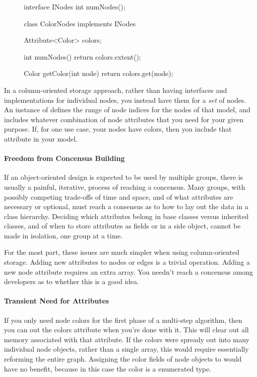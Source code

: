\begin{figure}
\begin{framedlisting}
interface INodes {
  int numNodes();
}

class ColorNodes implements INodes {
  Attribute<Color> colors;
  
  int numNodes() {
    return colors.extent();
  }
  
  Color getColor(int node) {
    return colors.get(node);
  }
}
\end{framedlisting}
\end{figure}
In a column-oriented storage approach, rather than having interfaces and
implementations for individual nodes, you instead have them for a
\emph{set} of nodes. An instance of  
defines the range of node indices for the nodes of that model, and includes
whatever combination of node attributes that you need for your given purpose.
If, for one use case, your nodes have colors, then you include that attribute in
your  model.

\paragraph{Freedom from Concensus Building}
If an object-oriented design is expected to be used by multiple groups, there is
usually a painful, iterative, process of reaching a concensus. Many groups, with
possibly competing trade-offs of time and space, and of what attributes are
necessary or optional, must reach a consensus as to how to lay out the data in a
class hierarchy.
Deciding which attributes belong in base classes versus
inherited classes, and of when to store attributes as fields or in a side
object, cannot be made in isolation, one group at a time. 

For the most part, these issues are much simpler when using column-oriented
storage. Adding new attributes to nodes or edges is a trivial operation. Adding
a new node attribute requires an extra array. You needn't reach a concensus
among developers as to whether this is a good idea.

\paragraph{Transient Need for Attributes}
If you only need node colors for the first phase of a multi-step algorithm, then
you can  out the colors attribute when you're done with it. This will
clear out all memory associated with that attribute. If the colors were spready
out into many individual node objects, rather than a single array, this would
require essentially reforming the entire graph. Assigning the color fields of
node objects to  would have no benefit, because in this case  the
color is a enumerated type.


